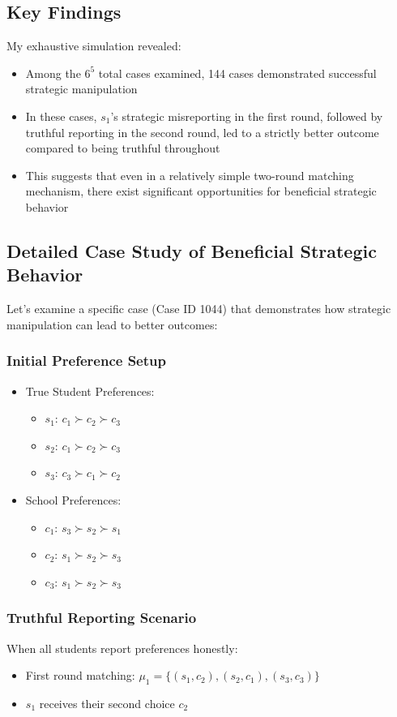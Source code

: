 \documentclass{article}
\begin{document}
\subsection{Key Findings}
My exhaustive simulation revealed:
\begin{itemize}
    \item Among the $6^5$ total cases examined, 144 cases demonstrated successful strategic manipulation
    \item In these cases, $s_1$'s strategic misreporting in the first round, followed by truthful reporting in the second round, led to a strictly better outcome compared to being truthful throughout
    \item This suggests that even in a relatively simple two-round matching mechanism, there exist significant opportunities for beneficial strategic behavior
\end{itemize}

\subsection{Detailed Case Study of Beneficial Strategic Behavior}
Let's examine a specific case (Case ID 1044) that demonstrates how strategic manipulation can lead to better outcomes:

\subsubsection{Initial Preference Setup}
\begin{itemize}
    \item True Student Preferences:
    \begin{itemize}
        \item $s_1$: $c_1 \succ c_2 \succ c_3$
        \item $s_2$: $c_1 \succ c_2 \succ c_3$
        \item $s_3$: $c_3 \succ c_1 \succ c_2$
    \end{itemize}
    \item School Preferences:
    \begin{itemize}
        \item $c_1$: $s_3 \succ s_2 \succ s_1$
        \item $c_2$: $s_1 \succ s_2 \succ s_3$
        \item $c_3$: $s_1 \succ s_2 \succ s_3$
    \end{itemize}
\end{itemize}

\subsubsection{Truthful Reporting Scenario}
When all students report preferences honestly:
\begin{itemize}
    \item First round matching: $\mu_1 = \{(s_1,c_2), (s_2,c_1), (s_3,c_3)\}$
    \item $s_1$ receives their second choice $c_2$
\end{itemize}
\end{document}
